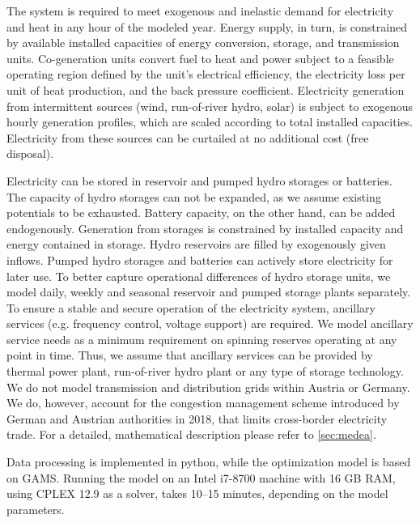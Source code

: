 \documentclass[review, 3p, times]{elsarticle} %
\begin{document}
    The system is required to meet exogenous and inelastic demand for electricity and heat in any hour of the modeled
    year.
    Energy supply, in turn, is constrained by available installed capacities of energy conversion, storage, and
    transmission units.
    Co-generation units convert fuel to heat and power subject to a feasible operating region defined by the unit's
    electrical efficiency, the electricity loss per unit of heat production, and the back pressure coefficient.
    Electricity generation from intermittent sources (wind, run-of-river hydro, solar) is subject to exogenous hourly
    generation profiles, which are scaled according to total installed capacities.
    Electricity from these sources can be curtailed at no additional cost (free disposal).

    Electricity can be stored in reservoir and pumped hydro storages or batteries.
    The capacity of hydro storages can not be expanded, as we assume existing potentials to be exhausted.
    Battery capacity, on the other hand, can be added endogenously.
    Generation from storages is constrained by installed capacity and energy contained in storage.
    Hydro reservoirs are filled by exogenously given inflows.
    Pumped hydro storages and batteries can actively store electricity for later use.
    To better capture operational differences of hydro storage units, we model daily, weekly and seasonal reservoir and
    pumped storage plants separately.
    To ensure a stable and secure operation of the electricity system, ancillary services (e.g. frequency control,
    voltage support) are required.
    We model ancillary service needs as a minimum requirement on spinning reserves operating at any point in time.
    Thus, we assume that ancillary services can be provided by thermal power plant, run-of-river hydro plant or any
    type of storage technology.
    We do not model transmission and distribution grids within Austria or Germany.
    We do, however, account for the congestion management scheme introduced by German and Austrian authorities in 2018,
    that limits cross-border electricity trade.
    For a detailed, mathematical description please refer to \ref{sec:medea}.

    Data processing is implemented in python, while the optimization model is based on GAMS.
    Running the model on an Intel i7-8700 machine with 16 GB RAM, using CPLEX 12.9 as a solver, takes 10--15 minutes,
    depending on the model parameters.
\end{document}
